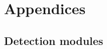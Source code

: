 \part{Appendices} \label{sec:appendices}
\chapter{Detection modules} \label{ch:detection-modules}



